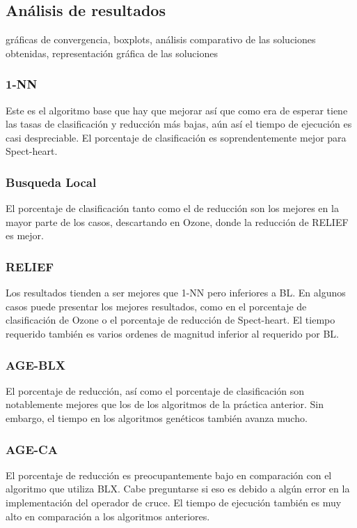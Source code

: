 \documentclass[12pt, spanish]{article}
\begin{document}
\subsection{Análisis de resultados}
gráficas de convergencia, boxplots, análisis comparativo de las soluciones obtenidas, representación gráfica de las soluciones
\subsubsection{1-NN}
Este es el algoritmo base que hay que mejorar así que como era de esperar tiene las tasas de clasificación y reducción más bajas, aún así el tiempo de ejecución es casi despreciable. El porcentaje de clasificación es soprendentemente mejor para Spect-heart.
\subsubsection{Busqueda Local}
El porcentaje de clasificación tanto como el de reducción son los mejores en la mayor parte de los casos, descartando en Ozone, donde la reducción de RELIEF es mejor. 

\subsubsection{RELIEF}
Los resultados tienden a ser mejores que 1-NN pero inferiores a BL. En algunos casos puede presentar los mejores resultados, como en el porcentaje de clasificación de Ozone o el porcentaje de reducción de Spect-heart. El tiempo requerido también es varios ordenes de magnitud inferior al requerido por BL. 
\subsubsection{AGE-BLX}
El porcentaje de reducción, así como el porcentaje de clasificación son notablemente mejores que los de los algoritmos de la práctica anterior. Sin embargo, el tiempo en los algoritmos genéticos también avanza mucho. 
\subsubsection{AGE-CA}
El porcentaje de reducción es preocupantemente bajo en comparación con el algoritmo que utiliza BLX. Cabe preguntarse si eso es debido a algún error en la implementación del operador de cruce. El tiempo de ejecución también es muy alto en comparación a los algoritmos anteriores. 
\subsubsection{}
\end{document}
